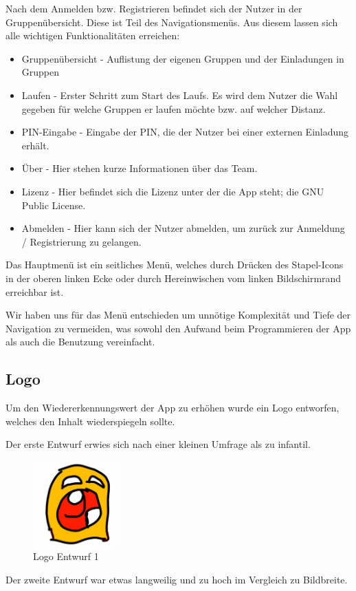 Nach dem Anmelden bzw. Registrieren befindet sich der Nutzer in der Gruppenübersicht. Diese ist Teil des Navigationsmenüs. Aus diesem lassen sich alle wichtigen Funktionalitäten erreichen:
\begin{itemize}
\item Gruppenübersicht - Auflistung der eigenen Gruppen und der Einladungen in Gruppen
\item Laufen - Erster Schritt zum Start des Laufs. Es wird dem Nutzer die Wahl gegeben für welche Gruppen er laufen möchte bzw. auf welcher Distanz.
\item PIN-Eingabe - Eingabe der PIN, die der Nutzer bei einer externen Einladung erhält.
\item Über - Hier stehen kurze Informationen über das Team.
\item Lizenz - Hier befindet sich die Lizenz unter der die App steht; die GNU Public License. 
\item Abmelden - Hier kann sich der Nutzer abmelden, um zurück zur Anmeldung / Registrierung zu gelangen.
\end{itemize}

Das Hauptmenü ist ein seitliches Menü, welches durch Drücken des Stapel-Icons in der oberen linken Ecke oder durch Hereinwischen vom linken Bildschirmrand erreichbar ist.

Wir haben uns für das Menü entschieden um unnötige Komplexität und Tiefe der Navigation zu vermeiden, was sowohl den Aufwand beim Programmieren der App als auch die Benutzung vereinfacht.

\subsection{Logo}
Um den Wiedererkennungswert der App zu erhöhen wurde ein Logo entworfen, welches den Inhalt wiederspiegeln sollte.

Der erste Entwurf erwies sich nach einer kleinen Umfrage als zu infantil.

\begin{figure}[!h]
\centering
\includegraphics[width=0.3\textwidth]{abb/icon_entwurf1}
\caption{Logo Entwurf 1}
\end{figure}
Der zweite Entwurf war etwas langweilig und zu hoch im Vergleich zu Bildbreite. 

